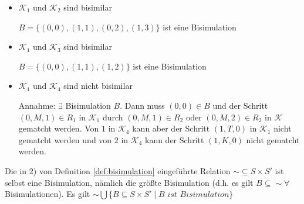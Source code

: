\begin{bsp}
	\begin{itemize}
		\item $\mathcal{K}_1$ und $\mathcal{K}_2$ sind bisimilar
		
		$B= \{(0,0), (1,1), (0,2), (1,3)\}$ ist eine Bisimulation
		
		\item $\mathcal{K}_1$ und $\mathcal{K}_3$ sind bisimilar
		
		$B= \{(0,0), (1,1), (1,2)\}$ ist eine Bisimulation
		
		\item $\mathcal{K}_1$ und $\mathcal{K}_4$ sind nicht bisimilar
		
		Annahme: $\exists$ Bisimulation $B$. Dann muss $(0,0) \in B$ und der Schritt $(0, M, 1) \in R_1$ in $\mathcal{K}_1$ durch $(0, M, 1) \in R_2$ oder $(0, M, 2) \in R_2$ in $\mathcal{K}$ gematcht werden. Von $1$ in $\mathcal{K}_4$ kann aber der Schritt $(1,T,0)$ in $\mathcal{K}_1$ nicht gematcht werden und von $2$ in $\mathcal{K}_4$ kann der Schritt $(1, K, 0)$ nicht gematcht werden.
	\end{itemize}
\end{bsp}

\begin{lemma}
	Die in 2) von Definition \ref{def:bisimulation} eingeführte Relation $\sim \subseteq S \times S'$ ist selbst eine Bisimulation, nämlich die größte Bisimulation (d.h. es gilt $B \subseteq \sim \forall$ Bisimulationen). Es gilt $\sim \bigcup \{B \subseteq S \times S' \mid B \textit{ ist Bisimulation}\}$
\end{lemma}

